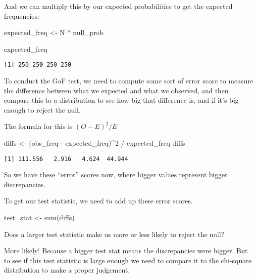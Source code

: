 \documentclass[
  letterpaper,
  DIV=11,
  numbers=noendperiod]{scrartcl}
\newenvironment{Shaded}{\begin{snugshade}}{\end{snugshade}}
\newcommand{\DecValTok}[1]{\textcolor[rgb]{0.68,0.00,0.00}{#1}}
\newcommand{\FunctionTok}[1]{\textcolor[rgb]{0.28,0.35,0.67}{#1}}
\newcommand{\NormalTok}[1]{\textcolor[rgb]{0.00,0.23,0.31}{#1}}
\newcommand{\OtherTok}[1]{\textcolor[rgb]{0.00,0.23,0.31}{#1}}
\newcommand{\SpecialCharTok}[1]{\textcolor[rgb]{0.37,0.37,0.37}{#1}}
\begin{document}
And we can multiply this by our expected probabilities to get the
expected frequencies:

\begin{Shaded}
\begin{Highlighting}[]
\NormalTok{expected\_freq }\OtherTok{\textless{}{-}}\NormalTok{ N }\SpecialCharTok{*}\NormalTok{ null\_prob}

\NormalTok{expected\_freq}
\end{Highlighting}
\end{Shaded}

\begin{verbatim}
[1] 250 250 250 250
\end{verbatim}

To conduct the GoF test, we need to compute some sort of error score to
measure the difference between what we expected and what we observed,
and then compare this to a distribution to see how big that difference
is, and if it's big enough to reject the null.

The formula for this is \((O - E)^2 / E\)

\begin{Shaded}
\begin{Highlighting}[]
\NormalTok{diffs }\OtherTok{\textless{}{-}}\NormalTok{ (obs\_freq }\SpecialCharTok{{-}}\NormalTok{ expected\_freq)}\SpecialCharTok{\^{}}\DecValTok{2} \SpecialCharTok{/}\NormalTok{ expected\_freq}
\NormalTok{diffs}
\end{Highlighting}
\end{Shaded}

\begin{verbatim}
[1] 111.556   2.916   4.624  44.944
\end{verbatim}

So we have these ``error'' scores now, where bigger values represent
bigger discrepancies.

To get our test statistic, we need to add up these error scores.

\begin{Shaded}
\begin{Highlighting}[]
\NormalTok{test\_stat }\OtherTok{\textless{}{-}} \FunctionTok{sum}\NormalTok{(diffs)}
\end{Highlighting}
\end{Shaded}

Does a larger test statistic make us more or less likely to reject the
null?

More likely! Because a bigger test stat means the discrepancies were
bigger. But to see if this test statistic is large enough we need to
compare it to the chi-square distribution to make a proper judgement.
\end{document}
